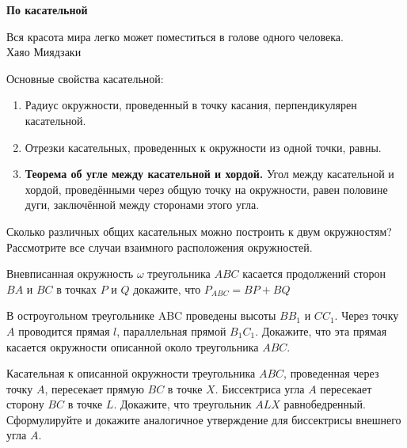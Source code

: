 \centerline{\bf \Huge По касательной}

\begin{flushright}
        \scriptsize{Вся красота мира легко может поместиться в голове одного человека.\\ Хаяо Миядзаки}
\end{flushright}

Основные свойства касательной:

\begin{enumerate}
    \item[(a)] Радиус окружности, проведенный в точку касания, перпендикулярен касательной. 
    
    \item[(b)] Отрезки касательных, проведенных к окружности из одной точки, равны.
    
    \item[(c)] \textbf{Теорема об угле между касательной и хордой.} Угол между касательной и хордой, проведёнными через общую точку на окружности, равен половине дуги, заключённой между сторонами этого угла.
\end{enumerate}


Сколько различных общих касательных можно построить к двум окружностям? Рассмотрите все случаи взаимного расположения окружностей.

Вневписанная окружность $\omega$ треугольника $ABC$ касается продолжений сторон $BA$ и $BC$ в точках $P$ и $Q$ докажите, что $P_{ABC} = BP + BQ$

В остроугольном треугольнике ABC проведены высоты $BB_1$ и $CC_1$. Через точку $A$ проводится прямая $l$, параллельная прямой $B_1C_1$. Докажите, что эта прямая касается окружности описанной около треугольника $ABC$.


Касательная к описанной окружности треугольника $ABC$, проведенная через точку $A$, пересекает прямую $BC$ в точке $X$. Биссектриса угла $A$ пересекает сторону $BC$ в точке $L$. Докажите, что треугольник $ALX$ равнобедренный. Сформулируйте и докажите аналогичное утверждение для биссектрисы внешнего угла $A$.


